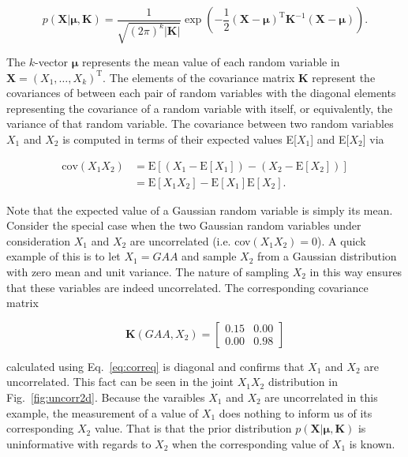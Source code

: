\begin{equation}
  p(\mathbf{X}|\boldsymbol{\mu},\mathbf{K}) = \frac{1}{\sqrt{(2\pi)^k
      |\mathbf{K}|}} \exp{\left( -\frac{1}{2} (\mathbf{X} -
    \boldsymbol{\mu})^{\text{T}} \mathbf{K}^{-1} (\mathbf{X}-\boldsymbol{\mu})
    \right)}.
\end{equation}

\noindent The $k$-vector $\boldsymbol{\mu}$ represents the mean value of each
random variable in $\mathbf{X}=(X_1,\dots,X_k)^{\text{T}}$.
The elements of the covariance matrix
$\mathbf{K}$ represent the covariances of between each pair of random variables
with the diagonal elements representing the covariance of a random variable
with itself, or equivalently, the variance of that random variable.
The covariance between two random variables $X_1$ and $X_2$ is computed in terms
of their expected values E[$X_1$] and E[$X_2$] via

\begin{align}
  \text{cov}(X_1X_2) &= \text{E}[(X_1-\text{E}[X_1]) - (X_2-\text{E}[X_2])] \\
  &= \text{E}[X_1X_2] - \text{E}[X_1]\text{E}[X_2].
  \label{eq:coveq}
\end{align}

\noindent Note that the expected value of a Gaussian random variable is simply
its mean. \\

Consider the special case when the two Gaussian random variables under
consideration $X_1$ and $X_2$ are uncorrelated (i.e. cov$(X_1X_2)=0$). A quick
example of this is to let $X_1=GAA$ and sample $X_2$ from a Gaussian distribution
with zero mean and unit variance. The nature of sampling $X_2$ in this way ensures
that these variables are indeed uncorrelated. The corresponding covariance matrix

\begin{equation}
  \mathbf{K}(GAA,X_2) =
  \begin{bmatrix}
    0.15 & 0.00 \\
    0.00 & 0.98
  \end{bmatrix}
  \label{eq:Kuncorr}
\end{equation}

\noindent calculated using Eq.~\ref{eq:correq} is diagonal and confirms that
$X_1$ and $X_2$ are uncorrelated. This fact can be seen in the joint $X_1X_2$
distribution in Fig.~\ref{fig:uncorr2d}.
Because the varaibles $X_1$ and $X_2$ are uncorrelated in this example, the
measurement of a value of $X_1$ does nothing to inform us of its corresponding
$X_2$ value. That is that the prior distribution
$p(\mathbf{X}|\boldsymbol{\mu},\mathbf{K})$ is uninformative with regards to
$X_2$ when the corresponding value of $X_1$ is known. \\


